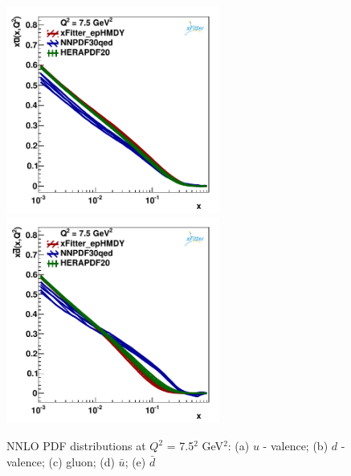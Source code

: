\begin{figure}
\includegraphics[width=7cm]{plots/ubar_7_5.pdf} 
\includegraphics[width=7cm]{plots/dbar_7_5.pdf} 
\caption{NNLO PDF distributions at $Q^{2}$ = 7.5$^{2}$ GeV$^{2}$: (a) $u$ - valence; (b) $d$ - valence; (c) gluon; (d) $\bar{u}$; (e) $\bar{d}$ }
\label{PDF_7.5GeV}
\end{figure}
